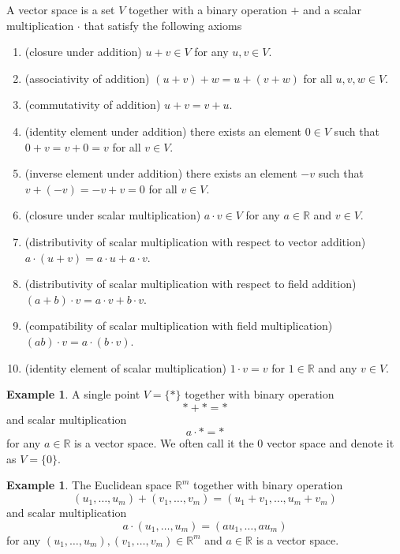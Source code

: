 \documentclass[12pt]{amsart}
\theoremstyle{definition}
\newtheorem{example}[theorem]{Example}
\begin{document}
\dfn A vector space is a set $V$ together with a binary operation $+$ and a scalar multiplication $\cdot$ that satisfy the following axioms
\begin{enumerate}[\indent 1.]
\item (closure under addition) $u + v \in V$ for any $u, v \in V$.
\item (associativity of addition) $(u + v) + w = u + (v + w)$ for all $u, v, w \in V$.
\item (commutativity of addition) $u + v = v + u$.
\item (identity element under addition) there exists an element $0 \in V$ such that $0 + v = v + 0 = v$ for all $v \in V$.
\item (inverse element under addition) there exists an element $-v$ such that $v + (-v) = -v + v = 0$ for all $v \in V$.
\item (closure under scalar multiplication) $a \cdot v \in V$ for any $a \in \mathbb{R}$ and $v \in V$.
\item (distributivity of scalar multiplication with respect to vector addition) $a \cdot (u + v) = a \cdot u + a \cdot v$.
\item (distributivity of scalar multiplication with respect to field addition) $(a + b) \cdot v = a \cdot v + b \cdot v$.
\item (compatibility of scalar multiplication with field multiplication) $(a b) \cdot v = a \cdot (b \cdot v)$.
\item (identity element of scalar multiplication) $1 \cdot v = v$ for $1 \in \mathbb{R}$ and any $v \in V$.
\end{enumerate}
\vfill
\pagebreak

\begin{example} \label{0_vector_space} A single point $V = \{\ast\}$ together with binary operation
$$\ast + \ast = \ast$$
and scalar multiplication
$$a \cdot \ast = \ast$$
for any $a \in \mathbb{R}$ is a vector space. We often call it the 0 vector space and denote it as $V = \{0\}$.
\end{example}
\vspace{30pt}

\begin{example} \label{Euclidean_space} The Euclidean space $\mathbb{R}^m$ together with binary operation
$$(u_1, \dots , u_m) + (v_1, \dots , v_m) = (u_1 + v_1, \dots , u_m + v_m)$$
and scalar multiplication
$$a \cdot (u_1, \dots , u_m) = (a u_1, \dots , a u_m)$$
for any $(u_1, \dots , u_m), (v_1, \dots , v_m) \in \mathbb{R}^m$ and $a \in \mathbb{R}$ is a vector space.
\end{example}
\vfill
\pagebreak
\end{document}
